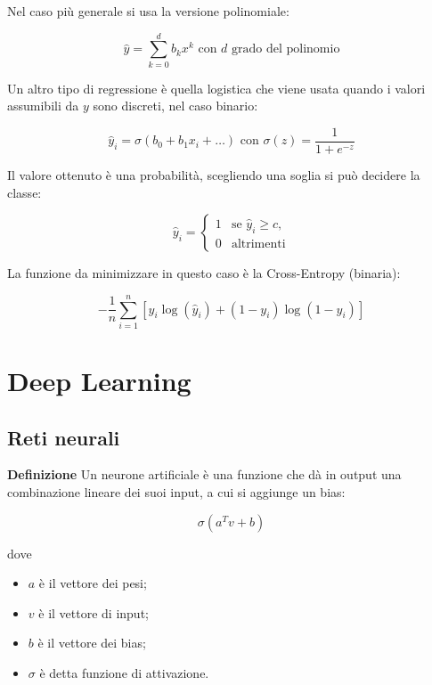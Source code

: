 \documentclass{article}
\newcommand{\df}{\noindent\textbf{Definizione} }
\begin{document}
Nel caso più generale si usa la versione polinomiale:

\[
\hat{y}=\sum_{k=0}^{d} b_kx^k \text{ con $d$ grado del polinomio}
\]\newline

Un altro tipo di regressione è quella logistica che viene usata quando i valori assumibili da $y$ sono discreti, nel caso binario:

\[
\hat{y}_i=\sigma(b_0+b_1x_i+\ldots)
\text{ con }
\sigma(z)=\frac{1}{1+e^{-z}}
\]

\vspace{5pt}

Il valore ottenuto è una probabilità, scegliendo una soglia si può decidere la classe:

\[
\hat{y}_i=
\begin{cases}
1 & \text{se } \hat{y}_i\geq c,\\
0 & \text{altrimenti}
\end{cases}
\]

\vspace{5pt}

La funzione da minimizzare in questo caso è la Cross-Entropy (binaria):

\[
-\frac1n\sum_{i=1}^{n}
\left[
y_i\log(\hat{y}_i)
+(1-y_i)\log(1-\hat{y}_i)
\right]
\]

\newpage

\section{Deep Learning}

\subsection{Reti neurali}

\df Un neurone artificiale è una funzione che dà in output una combinazione lineare dei suoi input, a cui si aggiunge un bias:

\[
\sigma(a^Tv+b)
\]

dove

\begin{itemize}
    \item $a$ è il vettore dei pesi;
    \item $v$ è il vettore di input;
    \item $b$ è il vettore dei bias;
    \item $\sigma$ è detta funzione di attivazione.\newline
\end{itemize}
\end{document}

